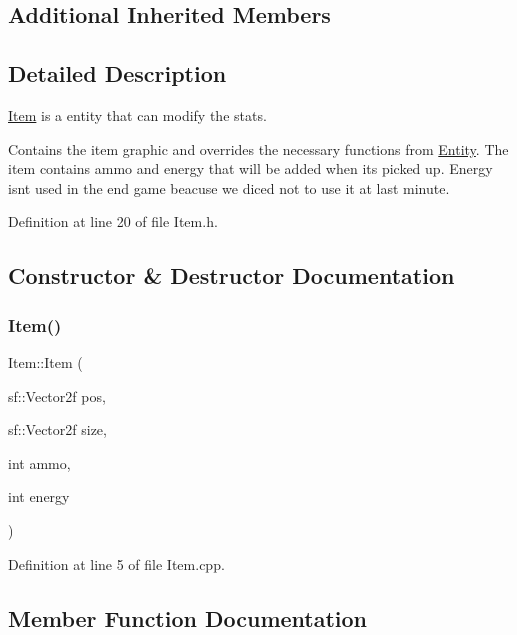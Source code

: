 \subsection*{Additional Inherited Members}


\subsection{Detailed Description}
\hyperlink{class_item}{Item} is a entity that can modify the stats. 

Contains the item graphic and overrides the necessary functions from \hyperlink{class_entity}{Entity}. The item contains ammo and energy that will be added when it{\ttfamily s picked up. Energy isn}t used in the end game beacuse we diced not to use it at last minute. 

Definition at line 20 of file Item.\+h.



\subsection{Constructor \& Destructor Documentation}
\mbox{\label{class_item_a951b1f5cf04cf8d9ecfdae8553508f0a}} 
\subsubsection{\texorpdfstring{Item()}{Item()}}
{\footnotesize\ttfamily Item\+::\+Item (\begin{DoxyParamCaption}\item[{sf\+::\+Vector2f}]{pos,  }\item[{sf\+::\+Vector2f}]{size,  }\item[{int}]{ammo,  }\item[{int}]{energy }\end{DoxyParamCaption})}



Definition at line 5 of file Item.\+cpp.



\subsection{Member Function Documentation}
\mbox{\label{class_item_a2ec323b2001bee948fa560ee8ee48067}} 
